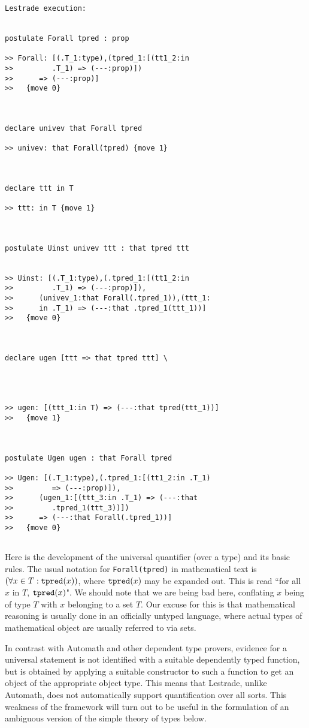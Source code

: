 \documentclass[12pt]{article}
\begin{document}
\begin{verbatim}Lestrade execution:


postulate Forall tpred : prop

>> Forall: [(.T_1:type),(tpred_1:[(tt1_2:in
>>         .T_1) => (---:prop)])
>>      => (---:prop)]
>>   {move 0}



declare univev that Forall tpred

>> univev: that Forall(tpred) {move 1}



declare ttt in T

>> ttt: in T {move 1}



postulate Uinst univev ttt : that tpred ttt


>> Uinst: [(.T_1:type),(.tpred_1:[(tt1_2:in
>>         .T_1) => (---:prop)]),
>>      (univev_1:that Forall(.tpred_1)),(ttt_1:
>>      in .T_1) => (---:that .tpred_1(ttt_1))]
>>   {move 0}



declare ugen [ttt => that tpred ttt] \
   



>> ugen: [(ttt_1:in T) => (---:that tpred(ttt_1))]
>>   {move 1}



postulate Ugen ugen : that Forall tpred

>> Ugen: [(.T_1:type),(.tpred_1:[(tt1_2:in .T_1)
>>         => (---:prop)]),
>>      (ugen_1:[(ttt_3:in .T_1) => (---:that
>>         .tpred_1(ttt_3))])
>>      => (---:that Forall(.tpred_1))]
>>   {move 0}


\end{verbatim}

Here is the development of the universal quantifier (over a type) and its basic rules.  The usual notation for {\tt Forall(tpred)} in mathematical text is $(\forall x\in T:{\tt tpred}(x))$, where ${\tt tpred}(x)$ may be expanded out.  This is read ``for all $x$ in $T$, ${\tt tpred}(x)$".  We should note that we are being bad here, conflating $x$ being of type $T$ with $x$ belonging to a set $T$.  Our excuse for this is that mathematical reasoning is usually done in an officially untyped language, where actual types of mathematical object are usually referred to via sets.

In contrast with Automath and other dependent type provers, evidence for a universal statement is not identified with a suitable dependently typed function, but is obtained by applying a suitable constructor to such a function to get an object of the appropriate object type.  This means that Lestrade, unlike Automath, does not automatically support quantification over all sorts.  This weakness of the framework will turn out to be useful in the formulation of an ambiguous version of the simple theory of types below.
\end{document}

